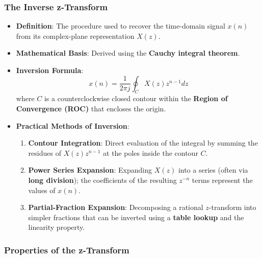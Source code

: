 \subsubsection{The Inverse z-Transform}\label{the-inverse-z-transform}

\begin{itemize}
\tightlist
\item
  \textbf{Definition}: The procedure used to recover the time-domain
  signal \(x(n)\) from its complex-plane representation \(X(z)\).
\item
  \textbf{Mathematical Basis}: Derived using the \textbf{Cauchy integral
  theorem}.
\item
  \textbf{Inversion Formula}:
  \[x(n) = \frac{1}{2\pi j} \oint_C X(z)z^{n-1} dz\] where \(C\) is a
  counterclockwise closed contour within the \textbf{Region of
  Convergence (ROC)} that encloses the origin.
\item
  \textbf{Practical Methods of Inversion}:

  \begin{enumerate}
  \def\labelenumi{\arabic{enumi}.}
  \tightlist
  \item
    \textbf{Contour Integration}: Direct evaluation of the integral by
    summing the residues of \(X(z)z^{n-1}\) at the poles inside the
    contour \(C\).
  \item
    \textbf{Power Series Expansion}: Expanding \(X(z)\) into a series
    (often via \textbf{long division}); the coefficients of the
    resulting \(z^{-n}\) terms represent the values of \(x(n)\).
  \item
    \textbf{Partial-Fraction Expansion}: Decomposing a rational
    \(z\)-transform into simpler fractions that can be inverted using a
    \textbf{table lookup} and the linearity property.
  \end{enumerate}
\end{itemize}

\subsubsection{Properties of the
z-Transform}\label{properties-of-the-z-transform}

